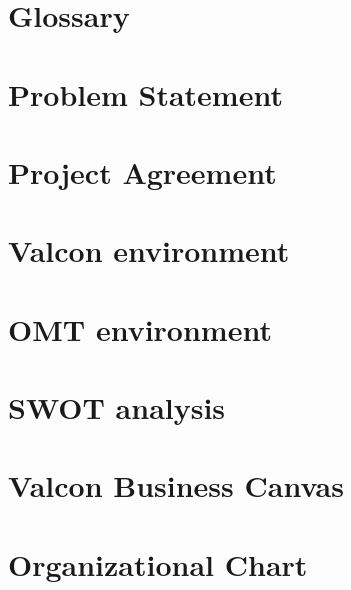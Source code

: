 \chapter{Glossary}

\chapter{Problem Statement}

\chapter{Project Agreement}

\chapter{Valcon environment}

\chapter{OMT environment}

\chapter{SWOT analysis}

\chapter{Valcon Business Canvas}


\label{app:it_strategy}

\chapter{Organizational Chart}


